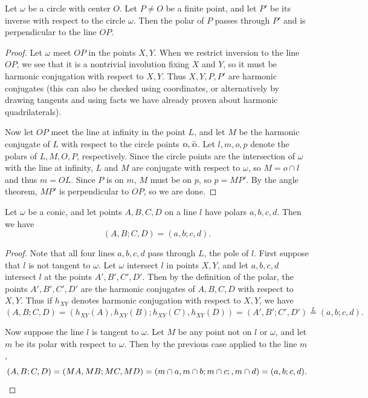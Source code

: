 \begin{thm} Let $\omega$ be a circle with center $O$. Let $P\ne O$ be a finite point, and let $P'$ be its inverse with respect to the circle $\omega$. Then the polar of $P$ passes through $P'$ and is perpendicular to the line $OP$.
\end{thm}
\begin{proof} Let $\omega$ meet $OP$ in the points $X,Y$. When we restrict inversion to the line $OP$, we see that it is a nontrivial involution fixing $X$ and $Y$, so it must be harmonic conjugation with respect to $X,Y$. Thus $X,Y,P,P'$ are harmonic conjugates (this can also be checked using coordinates, or alternatively by drawing tangents and using facts we have already proven about harmonic quadrilaterals).

Now let $OP$ meet the line at infinity in the point $L$, and let $M$ be the harmonic conjugate of $L$ with respect to the circle points $\fish, \bar\fish$. Let $l, m, o, p$ denote the polars of $L, M, O, P$, respectively. Since the circle points are the intersection of $\omega$ with the line at infinity, $L$ and $M$ are conjugate with respect to $\omega$, so $M = o\cap l$ and thus $m = OL$. Since $P$ is on $m$, $M$ must be on $p$, so $p = MP'$. By the angle theorem, $MP'$ is perpendicular to $OP$, so we are done.
\end{proof}

\begin{thm}\label{polarcross} Let $\omega$ be a conic, and let points $A,B,C,D$ on a line $l$ have polars $a,b,c,d$. Then we have
\[
(A,B;C,D) = (a,b;c,d).
\]
\end{thm}
\begin{proof} Note that all four lines $a,b,c,d$ pass through $L$, the pole of $l$. First suppose that $l$ is not tangent to $\omega$. Let $\omega$ intersect $l$ in points $X,Y$, and let $a,b,c,d$ intersect $l$ at the points $A',B',C',D'$. Then by the definition of the polar, the points $A',B',C',D'$ are the harmonic conjugates of $A,B,C,D$ with respect to $X,Y$. Thus if $h_{XY}$ denotes harmonic conjugation with respect to $X,Y$, we have
\[
(A,B;C,D) = (h_{XY}(A),h_{XY}(B);h_{XY}(C),h_{XY}(D)) = (A',B';C',D') \stackrel{L}{=} (a,b;c,d).
\]

Now suppose the line $l$ is tangent to $\omega$. Let $M$ be any point not on $l$ or $\omega$, and let $m$ be its polar with respect to $\omega$. Then by the previous case applied to the line $m$,
\[
(A,B;C,D) = (MA,MB;MC,MD) = (m\cap a, m\cap b; m\cap c;, m\cap d) = (a,b;c,d).\qedhere
\]
\end{proof}


